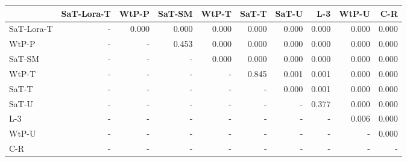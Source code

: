\begin{tabular}{lrrrrrrrrr}
\toprule
 & SaT-Lora-T & WtP-P & SaT-SM & WtP-T & SaT-T & SaT-U & L-3 & WtP-U & C-R \\
\midrule
SaT-Lora-T & - & 0.000 & 0.000 & 0.000 & 0.000 & 0.000 & 0.000 & 0.000 & 0.000 \\
WtP-P & - & - & 0.453 & 0.000 & 0.000 & 0.000 & 0.000 & 0.000 & 0.000 \\
SaT-SM & - & - & - & 0.000 & 0.000 & 0.000 & 0.000 & 0.000 & 0.000 \\
WtP-T & - & - & - & - & 0.845 & 0.001 & 0.001 & 0.000 & 0.000 \\
SaT-T & - & - & - & - & - & 0.000 & 0.001 & 0.000 & 0.000 \\
SaT-U & - & - & - & - & - & - & 0.377 & 0.000 & 0.000 \\
L-3 & - & - & - & - & - & - & - & 0.006 & 0.000 \\
WtP-U & - & - & - & - & - & - & - & - & 0.000 \\
C-R & - & - & - & - & - & - & - & - & - \\
\bottomrule
\end{tabular}

